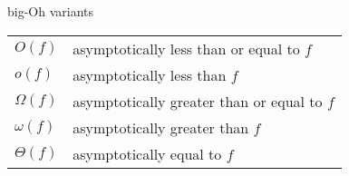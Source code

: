 \begin{frame}{big-Oh variants}
\begin{tabular}{ll}
$O(f)$ & asymptotically less than or equal to $f$ \\
$o(f)$ & asymptotically less than $f$ \\
$\Omega(f)$ & asymptotically greater than or equal to $f$ \\
$\omega(f)$ & asymptotically greater than $f$ \\
$\Theta(f)$ & asymptotically equal to $f$ \\
\end{tabular}
\end{frame}
